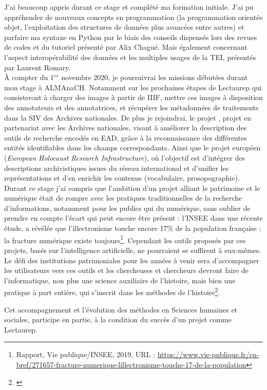 J'ai beaucoup appris durant ce stage et complété ma formation initiale. J'ai pu appréhender de nouveaux concepts en programmation (la programmation orientée objet, l'exploitation des structures de données plus avancées entre autres) et parfaire ma syntaxe en Python par le biais des conseils dispensés lors des revues de codes et du tutoriel présenté par Alix Chagué. Mais également concernant l'aspect interopérabilité des données et les multiples usages de la TEI, présentés par Laurent Romary.\\  

À compter du 1$^{er}$ novembre 2020, je poursuivrai les missions débutées durant mon stage à ALMAnaCH. Notamment sur les prochaines étapes de Lectaurep qui consisteront à charger des images à partir de IIIF, mettre ces images à disposition des annotateurs et des annotatrices, et récupérer les métadonnées de traitements dans la SIV des Archives nationales. De plus je rejoindrai, le projet , projet en partenariat avec les Archives nationales, visant à améliorer la description des outils de recherche encodés en EAD, grâce à la reconnaissance des différentes entités identifiables dans les champs correspondants. Ainsi que le projet européen  (\textit{European Holocaust Research Infrastructure}), où l'objectif est d'intégrer des descriptions archivistiques issues du réseau international et d'unifier les représentations et d'en enrichir les contenus (vocabulaire, prosopographie).\\

Durant ce stage j'ai compris que l'ambition d'un projet alliant le patrimoine et le numérique était de rompre avec les pratiques traditionnelles de la recherche d'informations, notamment pour les publics qui %
du numérique, sans oublier de prendre en compte l'écart qui peut encore être présent : l'INSEE dans une récente étude, a révélée que l'illectronisme touche encore 17\% de la population française ; la fracture numérique existe toujours\footnote{Rapport, Vie publique/INSEE, 2019, URL : \url{https://www.vie-publique.fr/en-bref/271657-fracture-numerique-lillectronisme-touche-17-de-la-population}}. Cependant les outils proposés par ces projets, basés sur l'intelligence artificielle, ne pourraient se suffirent à eux-mêmes. Le défi des institutions patrimoniales pour les années à venir sera d'accompagner les utilisateurs vers ces outils et les chercheuses et chercheurs devront faire de l'informatique, non plus une science auxiliaire de l'histoire, mais bien une pratique à part entière, qui s'inscrit dans les méthodes  de l'histoire\footnote{\cite{heimburger_faire_2011}}. 

Cet accompagnement et l'évolution des méthodes en Sciences humaines et sociales, participe en partie, à la condition du succès d'un projet comme Lectaurep.

